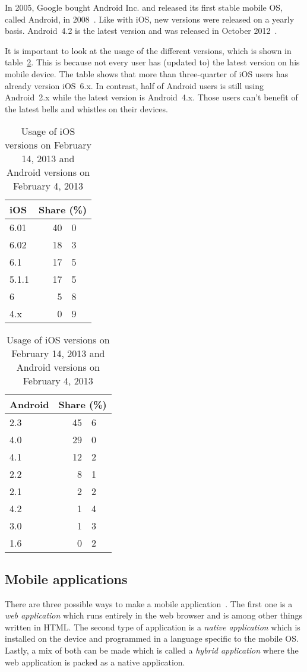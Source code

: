 \documentclass[a4paper]{artikel3}
\begin{document}
In 2005, Google bought Android Inc. and released its first stable mobile OS, called Android, in 2008~\cite{Satyesh2012}.
Like with iOS, new versions were released on a yearly basis.
Android~4.2 is the latest version and was released in October 2012~\cite{Sawers2012}.

It is important to look at the usage of the different versions, which is shown in table~\ref{table:mos-versions}.
This is because not every user has (updated to) the latest version on his mobile device.
The table shows that more than three-quarter of iOS users has already version iOS~6.x.
In contrast, half of Android users is still using Android~2.x while the latest version is Android~4.x. 
Those users can't benefit of the latest bells and whistles on their devices.

\begin{table}[t]
\centering
\begin{tabular}[b]{l r@{.}l}
\toprule
iOS    	& \multicolumn{2}{c}{Share (\%)} \\
\midrule
6.01		& 40 & 0 \\
6.02		& 18 & 3 \\
6.1		& 17 & 5	\\
5.1.1	& 17 & 5 \\
6		& 5 & 8 \\
4.x		& 0 & 9 \\
\bottomrule
\end{tabular}
\quad
\begin{tabular}[b]{l r@{.}l}
\toprule
Android	& \multicolumn{2}{c}{Share (\%)} \\
\midrule
2.3		& 45 & 6 \\
4.0		& 29 & 0 \\
4.1		& 12 & 2 \\
2.2		& 8 & 1 \\
2.1		& 2 & 2 \\
4.2		& 1 & 4 \\
3.0		& 1 & 3 \\
1.6 		& 0 & 2 \\
\bottomrule
\end{tabular}
\caption{Usage of iOS versions on February 14, 2013 and Android versions on February 4, 2013 \protect\cite{Sylvain2013,Android2013}}
\label{table:mos-versions}
\end{table}

\subsection{Mobile applications}
There are three possible ways to make a mobile application~\cite{Accenture2012,Hales2012}.
The first one is a \emph{web application} which runs entirely in the web browser and is among other things written in HTML.
The second type of application is a \emph{native application} which is installed on the device and programmed in a language specific to the mobile OS.
Lastly, a mix of both can be made which is called a \emph{hybrid application} where the web application is packed as a native application.
\end{document}
